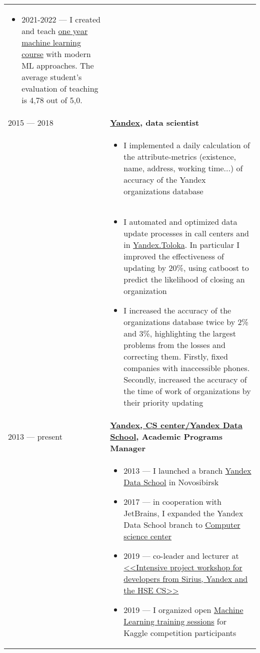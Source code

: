 \documentclass[11pt]{article}
\begin{document}
\begin{longtable} {l | p{}}
\begin{itemize}
  \item 2021-2022 — I created and teach \href{https://github.com/spbu-math-cs/ml-course/}{one year machine learning course} with modern ML approaches. The average student's evaluation of teaching is 4,78 out of 5,0.
\end{itemize}
\\
2015 — 2018 & {\textbf{\href{https://yandex.ru/}{Yandex}, data scientist}} \\
& \vspace{-1.5em} \begin{itemize}
	\item I implemented a daily calculation of the attribute-metrics (existence, name, address, working time...) of accuracy of the Yandex organizations database
	\end{itemize}
\\
& \vspace{-1.5em} \begin{itemize}
	\item I automated and optimized data update processes in call centers and in \href{https://toloka.yandex.ru}{Yandex.Toloka}. In particular I improved the effectiveness of updating by 20\%, using catboost to predict the likelihood of closing an organization
	\item I increased the accuracy of the organizations database twice by 2\% and 3\%, highlighting the largest problems from the losses and correcting them. Firstly, fixed companies with inaccessible phones. Secondly, increased the accuracy of the time of work of organizations by their priority updating
\end{itemize}
\\
2013 — present & {\textbf{\href{https://compscicenter.ru}{Yandex, CS center/Yandex Data School}, Academic Programs Manager}} \\
& \begin{itemize}
	\item 2013 — I launched a branch \href{https://yandexdataschool.ru}{Yandex Data School} in Novosibirsk
	\item 2017 — in cooperation with JetBrains, I expanded the Yandex Data School branch to \href{https://compscicenter.ru}{Computer science center}
	\item 2019 — co-leader and lecturer at \href{https://sochisirius.ru/obuchenie/graduates/smena240/1174}{<<Intensive project workshop for developers from Sirius, Yandex and the HSE CS>>}
	\item 2019 — I organized open \href{https://habr.com/ru/company/JetBrains-education/blog/458042/}{Machine Learning training sessions} for Kaggle competition participants

\end{itemize}
\end{longtable}
\end{document}
